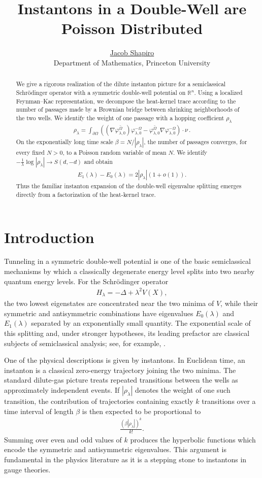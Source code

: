 \documentclass[a4paper,10pt]{article}
\title{Instantons in a Double-Well are Poisson Distributed}
\author{	\href{mailto:jacobshapiro@princeton.edu}{Jacob Shapiro}\\
	{\footnotesize Department of Mathematics, Princeton University}
}
\makeatletter
\newcommand{\reqnomode}{\tagsleft@false\let\veqno\@@eqno}
\numberwithin{equation}{section}
\theoremstyle{plain}
\theoremstyle{plain}
\theoremstyle{plain}
\theoremstyle{plain}
\theoremstyle{plain}
\theoremstyle{remark}
\theoremstyle{definition}
\newcommand{\RR}{\mathbb{R}}
\newcommand{\vf}{\varphi}
\newcommand{\abs}[1]{\left\lvert#1\right\rvert}
\newcommand{\eq}[1]{\begin{align*}#1\end{align*}}
\newcommand{\br}[1]{\left(#1\right)}
\makeatother
\begin{document}
\reqnomode
\maketitle
\begin{abstract}
We give a rigorous realization of the dilute instanton picture for a
semiclassical Schrödinger operator with a symmetric double-well potential
on $\RR^n$. Using a localized Feynman--Kac representation, we decompose the
heat-kernel trace according to the number of passages made by a Brownian
bridge between shrinking neighborhoods of the two wells. We identify the
weight of one passage with a hopping coefficient $\rho_\lambda$ 
\eq{
\rho_\lambda
=\int_{\partial\Omega}
\left(
\br{\nabla\overline{\vf_{\lambda,0}^\Omega}}
\vf_{\lambda,0}^{-\Omega}
-
\overline{\vf_{\lambda,0}^\Omega}
\nabla\vf_{\lambda,0}^{-\Omega}
\right)\cdot\nu\,.
}
On the exponentially long time scale $\beta=N/\abs{\rho_\lambda}$, the number of
passages converges, for every fixed $N>0$, to a Poisson random variable of
mean $N$. We identify $-\frac{1}{\lambda}\log\abs{\rho_\lambda}\to S(d,-d)$
and obtain
\eq{
E_1(\lambda)-E_0(\lambda)
=
2\abs{\rho_\lambda}\br{1+o(1)}.
}
Thus the familiar instanton expansion of the double-well eigenvalue
splitting emerges directly from a factorization of the heat-kernel trace.
\end{abstract}

\section{Introduction}

Tunneling in a symmetric double-well potential is one of the basic
semiclassical mechanisms by which a classically degenerate energy level
splits into two nearby quantum energy levels. For the Schrödinger operator
\eq{
H_\lambda=-\Delta+\lambda^2V(X),
}
the two lowest eigenstates are concentrated near the two minima of $V$,
while their symmetric and antisymmetric combinations have eigenvalues
$E_0(\lambda)$ and $E_1(\lambda)$ separated by an exponentially small
quantity. The exponential scale of this splitting and, under stronger
hypotheses, its leading prefactor are classical subjects of semiclassical
analysis; see, for example,
\cite{Simon_1984_10.2307/2007072,Helffer_Sjostrand_1984}.

One of the physical descriptions is given by instantons. In
Euclidean time, an instanton is a classical zero-energy trajectory joining
the two minima. The standard dilute-gas picture treats repeated transitions
between the wells as approximately independent events. If $\abs{\rho_\lambda}$
denotes the weight of one such transition, the contribution of trajectories
containing exactly $k$ transitions over a time interval of length $\beta$
is then expected to be proportional to
\eq{
\frac{\br{\beta\abs{\rho_\lambda}}^k}{k!}.
}
Summing over even and odd values of $k$ produces the hyperbolic functions
which encode the symmetric and antisymmetric eigenvalues. This argument is
fundamental in the physics literature
\cite{Coleman1985Uses,VainshteinEtAl1982ABC} as it is a stepping stone to instantons in gauge theories.
\end{document}
